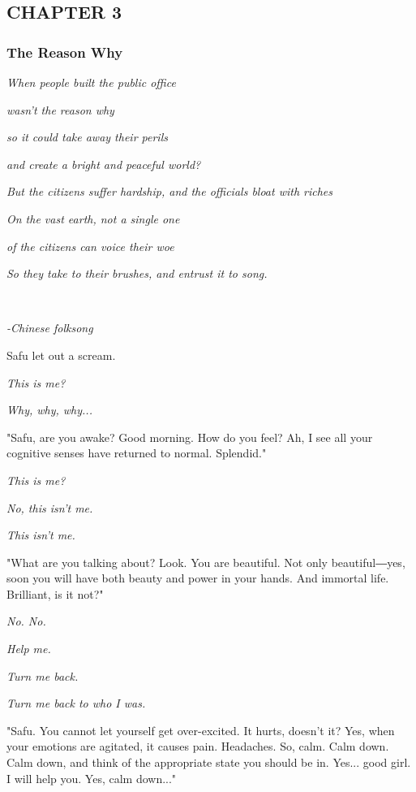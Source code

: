 \hypertarget{index_split_053.htmlux5cux23calibre_toc_4}{%
\subsection{CHAPTER 3}\label{index_split_053.htmlux5cux23calibre_toc_4}}

\subsubsection{The Reason Why}

\emph{When people built the public office}

\emph{wasn't the reason why}

\emph{so it could take away their perils}

\emph{and create a bright and peaceful world?}

\emph{But the citizens suffer hardship, and the officials bloat with
riches}

\emph{On the vast earth, not a single one}

\emph{of the citizens can voice their woe}

\emph{So they take to their brushes, and entrust it to song.}

\emph{\\
}

\emph{-Chinese folksong}

Safu let out a scream.

\emph{This is me?}

\emph{Why, why, why...}

"Safu, are you awake? Good morning. How do you feel? Ah, I see all your
cognitive senses have returned to normal. Splendid."

\emph{This is me?}

\emph{No, this isn't me.}

\emph{This isn't me.}

"What are you talking about? Look. You are beautiful. Not only
beautiful―yes, soon you will have both beauty and power in your hands.
And immortal life. Brilliant, is it not?"

\emph{No. No.}

\emph{Help me.}

\emph{Turn me back.}

\emph{Turn me back to who I was.}

"Safu. You cannot let yourself get over-excited. It hurts, doesn't it?
Yes, when your emotions are agitated, it causes pain. Headaches. So,
calm. Calm down. Calm down, and think of the appropriate state you
should be in. Yes... good girl. I will help you. Yes, calm down..."


